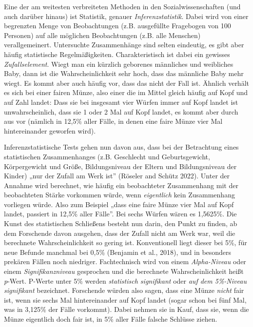 \documentclass[
  letterpaper,
  DIV=11,
  numbers=noendperiod]{scrreprt}
\begin{document}
\begin{tcolorbox}[enhanced jigsaw, title=\textcolor{quarto-callout-note-color}{\faInfo}\hspace{0.5em}{Statistische Signifikanz}, colbacktitle=quarto-callout-note-color!10!white, rightrule=.15mm, titlerule=0mm, left=2mm, bottomrule=.15mm, arc=.35mm, leftrule=.75mm, toprule=.15mm, opacityback=0, breakable, bottomtitle=1mm, colframe=quarto-callout-note-color-frame, toptitle=1mm, opacitybacktitle=0.6, coltitle=black, colback=white]

Eine der am weitesten verbreiteten Methoden in den Sozialwissenschaften
(und auch darüber hinaus) ist Statistik, genauer
\emph{Inferenzstatistik}. Dabei wird von einer begrenzten Menge von
Beobachtungen (z.B. ausgefüllte Fragebogen von 100 Personen) auf alle
möglichen Beobachtungen (z.B. alle Menschen) verallgemeinert.
Untersuchte Zusammenhänge sind selten eindeutig, es gibt aber häufig
statistische Regelmäßigkeiten. Charakteristisch ist dabei ein gewisses
\emph{Zufallselement}. Wiegt man ein kürzlich geborenes männliches und
weibliches Baby, dann ist die Wahrscheinlichkeit sehr hoch, dass das
männliche Baby mehr wiegt. Es kommt aber auch häufig vor, dass das nicht
der Fall ist. Ähnlich verhält es sich bei einer fairen Münze, also einer
die im Mittel gleich häufig auf Kopf und auf Zahl landet: Dass sie bei
insgesamt vier Würfen immer auf Kopf landet ist unwahrscheinlich, dass
sie 1 oder 2 Mal auf Kopf landet, es kommt aber durch aus vor (nämlich
in 12,5\% aller Fälle, in denen eine faire Münze vier Mal hintereinander
geworfen wird).

Inferenzstatistische Tests gehen nun davon aus, dass bei der Betrachtung
eines statistischen Zusammenhanges (z.B. Geschlecht und Geburtsgewicht,
Körpergewicht und Größe, Bildungsniveau der Eltern und Bildungsniveau
der Kinder) „nur der Zufall am Werk ist'' (Röseler and Schütz 2022).
Unter der Annahme wird berechnet, wie häufig ein beobachteter
Zusammenhang mit der beobachteten Stärke vorkommen würde, wenn
\emph{eigentlich} kein Zusammenhang vorliegen würde. Also zum Beispiel
„dass eine faire Münze vier Mal auf Kopf landet, passiert in 12,5\%
aller Fälle''. Bei sechs Würfen wären es 1,5625\%. Die Kunst des
statistischen Schließens besteht nun darin, den Punkt zu finden, ab dem
Forschende davon ausgehen, dass der Zufall nicht am Werk war, weil die
berechnete Wahrscheinlichkeit so gering ist. Konventionell liegt dieser
bei 5\%, für neue Befunde manchmal bei 0,5\% (Benjamin et al., 2018),
und in besonders prekären Fällen noch niedriger. Fachtechnisch wird von
einem \emph{Alpha-Niveau} oder einem \emph{Signifikanzniveau} gesprochen
und die berechnete Wahrscheinlichkeit heißt \emph{p}-Wert. P-Werte unter
5\% werden \emph{statistisch signifikant} oder \emph{auf dem 5\%-Niveau
signifikant} bezeichnet. Forschende würden also sagen, dass eine Münze
\emph{nicht} fair ist, wenn sie sechs Mal hintereinander auf Kopf landet
(sogar schon bei fünf Mal, was in 3,125\% der Fälle vorkommt). Dabei
nehmen sie in Kauf, dass sie, wenn die Münze eigentlich doch fair ist,
in 5\% aller Fälle falsche Schlüsse ziehen.


\end{tcolorbox}
\end{document}
